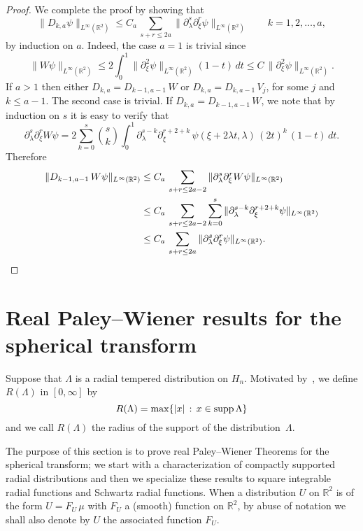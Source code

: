 \documentclass[12pt,a4paper]{amsart}
\theoremstyle{plain}
\theoremstyle{definition}
\numberwithin{equation}{section}
\begin{document}
\begin{proof}
We complete the proof by showing that 
$$
\|D_{k,a} \psi \|_{L^\infty({\mathbb R}^2)}\leq C_a\, 
\sum_{s+r\leq 2a}\|\partial_{\lambda}^s\partial_\xi^r \psi \|_{L^\infty({\mathbb R}^2)}
\qquad k=1,2,\ldots,a,
$$
by induction on $a$. Indeed, the case $a=1$ is trivial since
$$
\|W \psi \|_{L^\infty({\mathbb R}^2)}\leq 
2\int_0^1\|\partial^2_\xi \psi \|_{L^\infty({\mathbb R}^2)}(1-t)\,dt
\leq C\, 
\|\partial_\xi^2 \psi \|_{L^\infty({\mathbb R}^2)} .
$$
If $a>1$ then either $D_{k,a}=D_{k-1,a-1}\,W$ or $D_{k,a}=D_{k,a-1}\,V_j$, 
for some $j$ and $k\leq a-1$. The second case is trivial.
If $D_{k,a}=D_{k-1,a-1}\,W$, we note that  by induction on $s$ it is easy to verify that 
$$
\partial_{\lambda}^s\partial_\xi^r W \psi =
 2\sum_{k=0}^{s}\binom{s}{k}
 \int_0^1 \partial_{\lambda}^{s-k}\partial_\xi^{r+2+k}\, \psi(\xi+2{\lambda} t,{\lambda} )\,
 (2t)^{k}\,(1-t)\,dt.
$$
Therefore
  \begin{align*}
\|D_{k-1,a-1}\,W \psi \|_{L^\infty({\mathbb R}^2)}&\leq C_a\, 
\sum_{s+r\leq 2a-2}\|\partial_{\lambda}^s\partial_\xi^r W \psi \|_{L^\infty({\mathbb R}^2)}
\\ &\leq C_a\, 
\sum_{s+r\leq 2a-2}\sum_{k=0}^{s}\|\partial_{\lambda}^{s-k}\partial_\xi^{r+2+k} \psi \|_{L^\infty({\mathbb R}^2)}
\\ &\leq C_a\, 
\sum_{s+r\leq 2a}\|\partial_{\lambda}^s\partial_\xi^r   \psi \|_{L^\infty({\mathbb R}^2)}
.\qedhere
\end{align*}
\end{proof}

\bigskip

\section{Real Paley--Wiener results for the spherical transform}

Suppose that  $\Lambda$ is a radial tempered distribution on ${{H_{n}}}$.
Motivated by~\cite{Nils}, we define 
$R(\Lambda)$  in $[0,\infty]$ by
$$
R(\Lambda)=
{\rm max}{\left\{{|x|\, :\, x\in {\rm supp}\, \Lambda}\right\}}
$$
and we call $R(\Lambda)$ the radius of the support of the distribution~$\Lambda$.

The purpose of this section is to prove real Paley--Wiener Theorems for the spherical transform;
we start with a characterization of compactly supported radial
distributions and then we specialize these results to square integrable
radial functions and Schwartz radial functions. 
When a distribution $U$ on ${\mathbb R}^2$ is of the form $U=F_U\,\mu$ with $F_U$
a (smooth)  
 function on ${\mathbb R}^2$, by abuse of notation 
we shall also denote by $U$ the associated function $F_U$.
\end{document}
